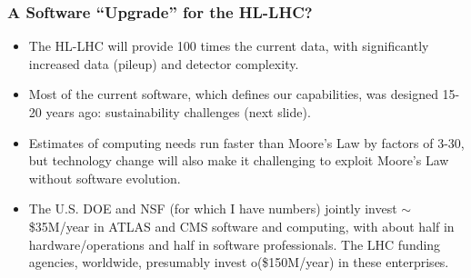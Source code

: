 \begin{frame}
\frametitle{A Software ``Upgrade'' for the HL-LHC?}

\begin{itemize}
\item The HL-LHC will provide 100 times the current data, with significantly increased data (pileup) and detector complexity.
\item Most of the current software, which defines our capabilities, was designed 15-20 years ago: sustainability challenges (next slide).
\item Estimates of computing needs run faster than Moore's Law by factors of 3-30, but technology change will also make it challenging to exploit Moore's Law without software evolution.
\item The U.S. DOE and NSF (for which I have numbers) jointly invest $\sim$ \$35M/year in ATLAS and CMS software and computing, with about half in hardware/operations and half in software professionals. The LHC funding agencies, worldwide, presumably invest o(\$150M/year) in these enterprises.
\end{itemize}

\end{frame}


